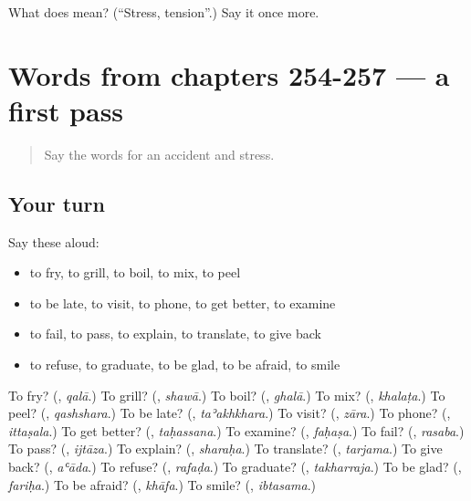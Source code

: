 \begin{tcolorbox}[breakable,colback=teal!4,colframe=teal!35!black,title={Before you move on}]
What does  mean? (\textquotedblleft{}Stress, tension\textquotedblright{}.) Say it once more.
\end{tcolorbox}
\section[(dialogue)]{Words from chapters 254-257 — a first pass}

\label{lesson:AR-R262-first-pass-words-from-chapters-254-257}



\begin{quote}
Say the words for an accident and stress.
\end{quote}

\subsection*{Your turn}
Say these aloud:

\begin{itemize}
\raggedright
  \item to fry, to grill, to boil, to mix, to peel
  \item to be late, to visit, to phone, to get better, to examine
  \item to fail, to pass, to explain, to translate, to give back
  \item to refuse, to graduate, to be glad, to be afraid, to smile
\end{itemize}

\begin{tcolorbox}[breakable,colback=teal!4,colframe=teal!35!black,title={Before you move on}]
To fry? (\textbf{}, \emph{qalā}.) To grill? (\textbf{}, \emph{shawā}.) To boil? (\textbf{}, \emph{ghalā}.) To mix? (\textbf{}, \emph{khalaṭa}.) To peel? (\textbf{}, \emph{qashshara}.) To be late? (\textbf{}, \emph{taʾakhkhara}.) To visit? (\textbf{}, \emph{zāra}.) To phone? (\textbf{}, \emph{ittaṣala}.) To get better? (\textbf{}, \emph{taḥassana}.) To examine? (\textbf{}, \emph{faḥaṣa}.) To fail? (\textbf{}, \emph{rasaba}.) To pass? (\textbf{}, \emph{ijtāza}.) To explain? (\textbf{}, \emph{sharaḥa}.) To translate? (\textbf{}, \emph{tarjama}.) To give back? (\textbf{}, \emph{aʿāda}.) To refuse? (\textbf{}, \emph{rafaḍa}.) To graduate? (\textbf{}, \emph{takharraja}.) To be glad? (\textbf{}, \emph{fariḥa}.) To be afraid? (\textbf{}, \emph{khāfa}.) To smile? (\textbf{}, \emph{ibtasama}.)
\end{tcolorbox}

